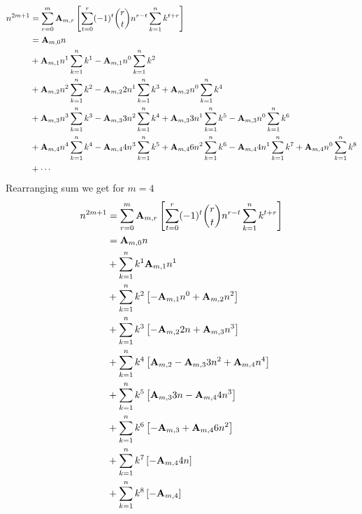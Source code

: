 \begin{equation}
    \begin{split}
        n^{2m+1}
        &= \sum_{r=0}^{m} {\mathbf{A}} \sb{m,r} \left[ \sum_{t=0}^{r} (-1)^t \binom{r}{t} n^{r-t} \sum_{k=1}^{n} k^{t+r} \right] \\
        &= {\mathbf{A}} \sb{m,0} n \\
        &+ {\mathbf{A}} \sb{m,1} n^{1} \sum_{k=1}^{n} k^{1} - {\mathbf{A}} \sb{m,1} n^{0} \sum_{k=1}^{n} k^{2} \\
        &+ {\mathbf{A}} \sb{m,2} n^{2} \sum_{k=1}^{n} k^{2} - {\mathbf{A}} \sb{m,2} 2 n^{1} \sum_{k=1}^{n} k^{3} + {\mathbf{A}} \sb{m,2} n^{0} \sum_{k=1}^{n} k^{4} \\
        &+ {\mathbf{A}} \sb{m,3} n^{3} \sum_{k=1}^{n} k^{3} - {\mathbf{A}} \sb{m,3} 3 n^{2} \sum_{k=1}^{n} k^{4} + {\mathbf{A}} \sb{m,3} 3 n^{1} \sum_{k=1}^{n} k^{5} - {\mathbf{A}} \sb{m,3} n^{0} \sum_{k=1}^{n} k^{6} \\
        &+ {\mathbf{A}} \sb{m,4} n^{4} \sum_{k=1}^{n} k^{4} - {\mathbf{A}} \sb{m,4} 4 n^{3} \sum_{k=1}^{n} k^{5} + {\mathbf{A}} \sb{m,4} 6 n^{2} \sum_{k=1}^{n} k^{6} - {\mathbf{A}} \sb{m,4} 4 n^{1} \sum_{k=1}^{n} k^{7} + {\mathbf{A}} \sb{m,4} n^{0} \sum_{k=1}^{n} k^{8} \\
        &+ \cdots \\
    \end{split}\label{eq:equation15}
\end{equation}
Rearranging sum we get for $m=4$
\begin{equation}
    \begin{split}
        n^{2m+1}
        &= \sum_{r=0}^{m} {\mathbf{A}} \sb{m,r} \left[ \sum_{t=0}^{r} (-1)^t \binom{r}{t} n^{r-t} \sum_{k=1}^{n} k^{t+r} \right] \\
        &= {\mathbf{A}} \sb{m,0} n \\
        &+ \sum_{k=1}^{n} k^{1} {\mathbf{A}} \sb{m,1} n^{1} \\
        &+ \sum_{k=1}^{n} k^{2} \left[ - {\mathbf{A}} \sb{m,1} n^{0} + {\mathbf{A}} \sb{m,2} n^{2} \right] \\
        &+ \sum_{k=1}^{n} k^{3} \left[ - {\mathbf{A}} \sb{m,2} 2n + {\mathbf{A}} \sb{m,3} n^3 \right] \\
        &+ \sum_{k=1}^{n} k^{4} \left[ {\mathbf{A}} \sb{m,2} - {\mathbf{A}} \sb{m,3} 3n^2 + {\mathbf{A}} \sb{m,4} n^4 \right] \\
        &+ \sum_{k=1}^{n} k^{5} \left[ {\mathbf{A}} \sb{m,3} 3n - {\mathbf{A}} \sb{m,4} 4n^3 \right] \\
        &+ \sum_{k=1}^{n} k^{6} \left[ - {\mathbf{A}} \sb{m,3} + {\mathbf{A}} \sb{m,4} 6n^2 \right] \\
        &+ \sum_{k=1}^{n} k^{7} \left[ - {\mathbf{A}} \sb{m,4} 4n \right] \\
        &+ \sum_{k=1}^{n} k^{8} \left[ - {\mathbf{A}} \sb{m,4} \right]
    \end{split}\label{eq:equation16}
\end{equation}
